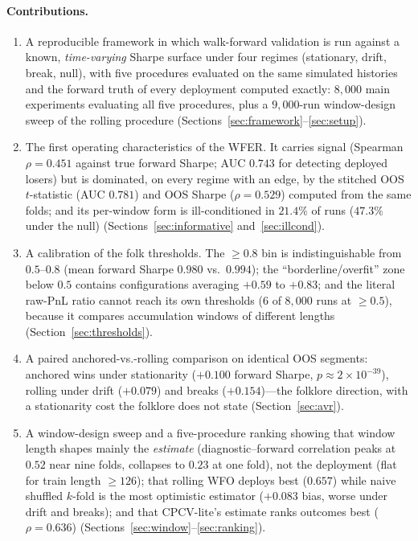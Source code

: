 \documentclass[11pt]{article}
\begin{document}
\paragraph{Contributions.}
\begin{enumerate}\itemsep2pt
\item A reproducible framework in which walk-forward validation is run against
a known, \emph{time-varying} Sharpe surface under four regimes (stationary,
drift, break, null), with five procedures evaluated on the same simulated
histories and the forward truth of every deployment computed exactly:
$8{,}000$ main experiments evaluating all five procedures, plus a
$9{,}000$-run window-design sweep of the rolling procedure
(Sections~\ref{sec:framework}--\ref{sec:setup}).
\item The first operating characteristics of the WFER. It carries signal
(Spearman $\rho=0.451$ against true forward Sharpe; AUC $0.743$ for detecting
deployed losers) but is dominated, on every regime with an edge, by the
stitched OOS $t$-statistic (AUC $0.781$) and OOS Sharpe ($\rho=0.529$)
computed from the same folds; and its per-window form is ill-conditioned in
$21.4\%$ of runs ($47.3\%$ under the null)
(Sections~\ref{sec:informative} and~\ref{sec:illcond}).
\item A calibration of the folk thresholds. The $\ge 0.8$ bin is
indistinguishable from $0.5$--$0.8$ (mean forward Sharpe $0.980$ vs.\
$0.994$); the ``borderline/overfit'' zone below $0.5$ contains configurations
averaging $+0.59$ to $+0.83$; and the literal raw-PnL ratio cannot reach its
own thresholds ($6$ of $8{,}000$ runs at ${\ge}0.5$), because it compares
accumulation windows of different lengths (Section~\ref{sec:thresholds}).
\item A paired anchored-vs.-rolling comparison on identical OOS segments:
anchored wins under stationarity ($+0.100$ forward Sharpe,
$p\approx2\times10^{-39}$), rolling under drift ($+0.079$) and breaks
($+0.154$)---the folklore direction, with a stationarity cost the folklore
does not state (Section~\ref{sec:avr}).
\item A window-design sweep and a five-procedure ranking showing that window
length shapes mainly the \emph{estimate} (diagnostic--forward correlation
peaks at $0.52$ near nine folds, collapses to $0.23$ at one fold), not the
deployment (flat for train length ${\ge}126$); that rolling WFO deploys best
($0.657$) while naive shuffled $k$-fold is the most optimistic estimator
($+0.083$ bias, worse under drift and breaks); and that CPCV-lite's estimate
ranks outcomes best ($\rho=0.636$)
(Sections~\ref{sec:window}--\ref{sec:ranking}).
\end{enumerate}
\end{document}
